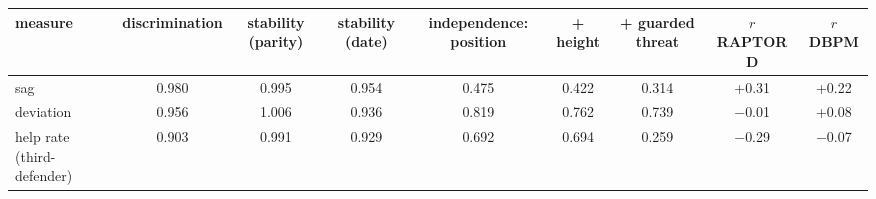\begin{tabular}{lcccccccc}
\hline
measure & discrimination & stability (parity) & stability (date) & independence: position & + height & + guarded threat & $r$ RAPTOR D & $r$ DBPM \\
\hline
sag & 0.980 & 0.995 & 0.954 & 0.475 & 0.422 & 0.314 & +0.31 & +0.22 \\
deviation & 0.956 & 1.006 & 0.936 & 0.819 & 0.762 & 0.739 & $-$0.01 & +0.08 \\
help rate (third-defender) & 0.903 & 0.991 & 0.929 & 0.692 & 0.694 & 0.259 & $-$0.29 & $-$0.07 \\
\hline
\end{tabular}
